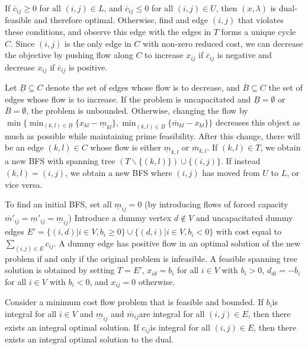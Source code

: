 \begin{thm}
  \label{sec:graphs-flows-6}
  If $\overline c_{ij} \geq 0$  for all $(i, j) \in L$, and $\overline
  c_{ij} \leq 0$ for all $(i, j)\in U$, then $(x, \lambda)$ is
  dual-feasible and therefore optimal. Otherwise, find and edge $(i,
  j)$ that violates these conditions, and observe this edge with the
  edges in $T$ forms a unique cycle $C$.  Since $(i, j)$ is the only
  edge in $C$ with non-zero reduced cost, we can decrease the
  objective by pushing flow along $C$ to increase $x_{ij}$ if
  $\overline c_{ij}$ is negative and decrease $x_{ij}$ if $\overline
  c_{ij}$ is positive.  

Let $\underline B \subseteq C$ denote the set of edges whose flow is
to decrease, and $\overline B \subseteq C$ the set of edges whose flow
is to increase.  If the problem is uncapacitated and $\underline B =
\emptyset$ or $\overline B = \emptyset$, the problem is unbounded.
Otherwise, changing the flow by $\min \{ \min_{(k, l) \in \underline
  B} \{ x_{kl} - \underline m_{kl} \}, \min_{(k, l) \in \overline B}
\{ \overline m_{kl} - x_{kl} \}  \} $ decreases this object as much as
possible while maintaining prime feasibility.  After this change,
there will be an edge $(k, l) \in C$  whose flow is either $\underline
m_{k,l}$ or $\overline m_{k,l}$.  If $(k, l) \in T$, we obtain a new
BFS with spanning tree $(T \backslash \{ (k, l) \}) \cup \{ (i, j)
\}$.  If instead $(k, l) = (i, j)$, we obtain a new BFS where $(i, j)$
has moved from $U$ to $L$, or vice versa.

To find an initial BFS, set all $\underline m_{ij} = 0$ (by
introducing flows of forced capacity $\overline m'_{ij} = \underline
m'_{ij} = \underline m_{ij}$)  Introduce a dummy vertex $d \notin V$
and uncapacitated dummy edges $E' = \{ (i, d) | i \in V, b_{i} \geq 0
\} \cup \{ (d, i) | i \in V, b_{i} < 0\}  $ with cost equal to
$\sum_{(i, j) \in E}^{} c_{ij}$.  A dummy edge has positive flow in an
optimal solution of the new problem if and only if the original
problem is infeasible. A feasible spanning tree solution is obtained
by setting $T = E'$, $x_{id} = b_{i}$ for all $i \in V$ with $b_{i} >
0$, $d_{di} = -b_{i}$ for all $i \in V$ with $b_{i} < 0$, and $x_{ij}
= 0$ otherwise.
\end{thm}

\begin{thm}
  \label{sec:graphs-flows-5}
  Consider a minimum cost flow problem that is feasible and bounded.
  If $b_{i}$is integral for all $i \in V$ and $\underline m_{ij}$ and
  $\overline m_{ij}$are integral for all $(i, j) \in E$, then there
  exists an integral optimal solution.  If $c_{ij}$is integral for all
  $(i, j)\in E$, then there exists an integral optimal solution to the dual.
\end{thm}

